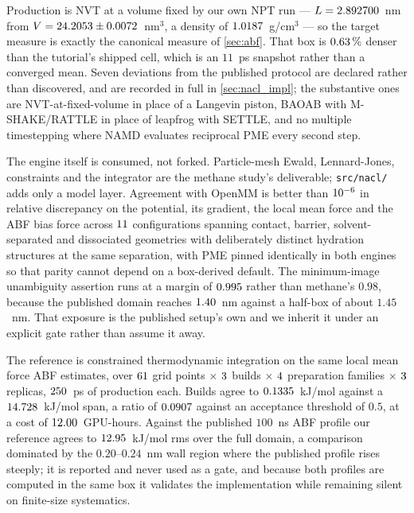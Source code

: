 Production is NVT at a volume fixed by our own NPT run --- $L = 2.892700$~nm from
$V = 24.2053 \pm 0.0072$~nm$^3$, a density of $1.0187$~g/cm$^3$ --- so the target measure
is exactly the canonical measure of \cref{sec:abf}. That box is $0.63\,\%$
denser than the tutorial's shipped cell, which is an $11$~ps snapshot rather than a converged
mean. Seven deviations from the published protocol are declared rather than discovered, and are
recorded in full in \cref{sec:nacl_impl}; the substantive ones are NVT-at-fixed-volume in place
of a Langevin piston, BAOAB with M-SHAKE/RATTLE in place of leapfrog with SETTLE, and no multiple
timestepping where NAMD evaluates reciprocal PME every second step.

The engine itself is consumed, not forked. Particle-mesh Ewald, Lennard-Jones, constraints and
the integrator are the methane study's deliverable; \texttt{src/nacl/} adds only a model layer.
Agreement with OpenMM is better than $10^{-6}$ in relative discrepancy on the potential, its
gradient, the local mean force and the ABF bias force across $11$ configurations
spanning contact, barrier, solvent-separated and dissociated geometries with deliberately
distinct hydration structures at the same separation, with PME pinned identically in both engines
so that parity cannot depend on a box-derived default. The minimum-image unambiguity assertion
runs at a margin of $0.995$ rather than methane's $0.98$, because the published
domain reaches $1.40$~nm against a half-box of about $1.45$~nm. That exposure is the published
setup's own and we inherit it under an explicit gate rather than assume it away.

The reference is constrained thermodynamic integration on the same local mean force ABF
estimates, over $61$ grid points $\times$ $3$ builds $\times$ $4$
preparation families $\times$ $3$ replicas, $250$~ps of production each.
Builds agree to $0.1335$~kJ/mol against a $14.728$~kJ/mol span, a ratio of
$0.0907$ against an acceptance threshold of $0.5$, at a cost of $12.00$~GPU-hours.
Against the published $100$~ns ABF profile our reference agrees to $12.95$~kJ/mol rms over
the full domain, a comparison dominated by the $0.20$--$0.24$~nm wall region where the published
profile rises steeply; it is reported and never used as a gate, and because both profiles are
computed in the same box it validates the implementation while remaining silent on finite-size
systematics.

